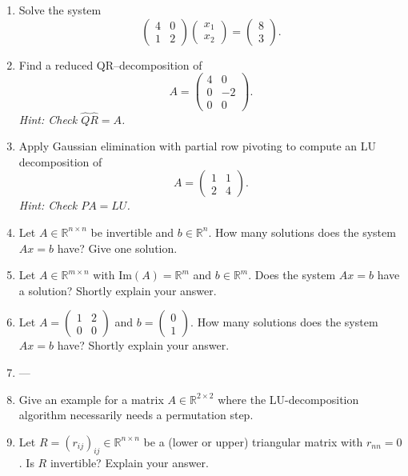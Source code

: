 \begin{enumerate}
	
	\item Solve the system
	$$\begin{pmatrix}
	4 & 0\\
	1 & 2
	\end{pmatrix}\begin{pmatrix}
	x_1 \\ x_2
	\end{pmatrix} = \begin{pmatrix}
	8 \\ 3
	\end{pmatrix}.  $$
	\item Find a reduced QR--decomposition of 
	$$A = \begin{pmatrix}
	4 & 0\\
	0 & -2 \\
	0 & 0
	\end{pmatrix} .$$
	\textit{Hint: Check $\widehat{Q}\widehat{R} = A$.}
	\item Apply Gaussian elimination with partial row pivoting to compute an LU decomposition of 
	$$A = \begin{pmatrix}
	1 & 1\\
	2 & 4
	\end{pmatrix} .$$
	\textit{Hint: Check $PA=LU$.}
	\item Let $A \in \mathbb{R}^{n \times n}$ be invertible and $b \in \mathbb{R}^n$. How many solutions does the system $Ax=b$ have? Give one solution.
	\item Let $A \in \mathbb{R}^{m \times n}$ with $\text{Im}(A)=\mathbb{R}^m$ and $b \in \mathbb{R}^m$. Does the system $Ax=b$ have a solution? Shortly explain your answer.
	\item Let $A = \begin{pmatrix}
	1 & 2\\
	0 & 0
	\end{pmatrix}$ and $b = \begin{pmatrix}
	0\\1
	\end{pmatrix}$. How many solutions does the system $Ax=b$ have? Shortly explain your answer.
	\item ---
	\item Give an example for a matrix $A \in \mathbb{R}^{2 \times 2}$ where the LU-decomposition algorithm
	necessarily needs a permutation step. 
	\item Let $R=(r_{ij})_{ij} \in \mathbb{R}^{n \times n}$ be a (lower or upper) triangular matrix with $r_{nn} = 0$. Is $R$ invertible? Explain your answer.

\end{enumerate}
